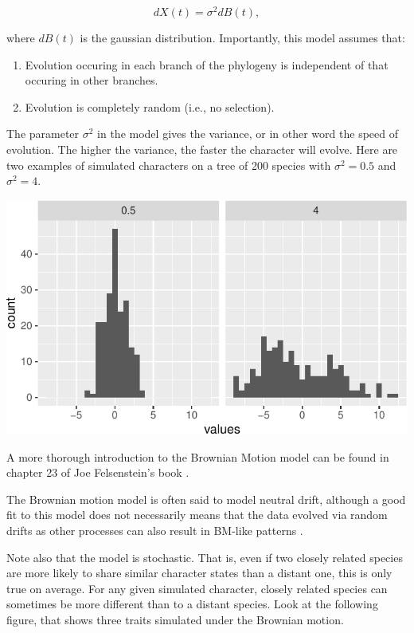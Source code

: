 \documentclass[
]{book}
\providecommand{\tightlist}{%
  \setlength{\itemsep}{0pt}\setlength{\parskip}{0pt}}
\begin{document}
\[dX(t)=\sigma^2 dB(t),\]

where \(dB(t)\) is the gaussian distribution. Importantly, this model assumes that:

\begin{enumerate}
\def\labelenumi{\arabic{enumi}.}
\tightlist
\item
  Evolution occuring in each branch of the phylogeny is independent of that occuring in other branches.
\item
  Evolution is completely random (i.e., no selection).
\end{enumerate}

The parameter \(\sigma^2\) in the model gives the variance, or in other word the speed of evolution. The higher the variance, the faster the character will evolve. Here are two examples of simulated characters on a tree of 200 species with \(\sigma^2=0.5\) and \(\sigma^2=4\).

\begin{center}\includegraphics{pcm-workshop_files/figure-latex/BM_Model_SigmaExample-1} \end{center}

A more thorough introduction to the Brownian Motion model can be found in chapter 23 of Joe Felsenstein's book \citep{felsenstein2004inferring}.

The Brownian motion model is often said to model neutral drift, although a good fit to this model does not necessarily means that the data evolved via random drifts as other processes can also result in BM-like patterns \citep{hansen1996translating}.

Note also that the model is stochastic. That is, even if two closely related species are more likely to share similar character states than a distant one, this is only true on average. For any given simulated character, closely related species can sometimes be more different than to a distant species. Look at the following figure, that shows three traits simulated under the Brownian motion.
\end{document}
